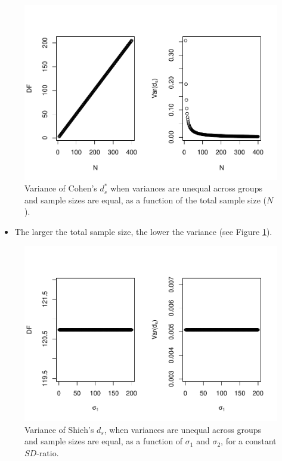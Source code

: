 \documentclass[
  english,
  man]{apa6}
\providecommand{\tightlist}{%
  \setlength{\itemsep}{0pt}\setlength{\parskip}{0pt}}
\begin{document}
\begin{figure}
\centering
\includegraphics{Theoretical-Variance-of-all-estimators-as-a-function-of-population-parameters_files/figure-latex/varshiehhetbalNsize2-1.pdf}
\caption{\label{fig:varshiehhetbalNsize2}Variance of Cohen's \(d^*_s\) when variances are unequal across groups and sample sizes are equal, as a function of the total sample size (\(N\)).}
\end{figure}

\begin{itemize}
\tightlist
\item
  The larger the total sample size, the lower the variance (see Figure \ref{fig:varshiehhetbalNsize2}).
\end{itemize}

\begin{figure}
\centering
\includegraphics{Theoretical-Variance-of-all-estimators-as-a-function-of-population-parameters_files/figure-latex/varshiehhetbalvariance2-1.pdf}
\caption{\label{fig:varshiehhetbalvariance2}Variance of Shieh's \(d_s\), when variances are unequal across groups and sample sizes are equal, as a function of \(\sigma_1\) and \(\sigma_2\), for a constant \(SD\)-ratio.}
\end{figure}
\end{document}
